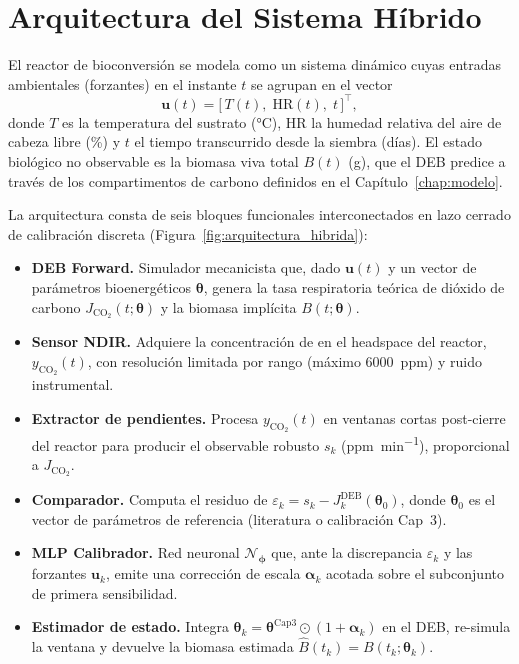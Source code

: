 \section{Arquitectura del Sistema Híbrido}
\label{sec:cap4_arquitectura}

El reactor de bioconversión se modela como un sistema dinámico cuyas entradas ambientales (forzantes) en el instante $t$ se agrupan en el vector
\begin{equation}
\mathbf{u}(t) = \bigl[\,T(t),\;\mathrm{HR}(t),\;t\,\bigr]^{\top},
\label{eq:forzantes}
\end{equation}
donde $T$ es la temperatura del sustrato (\si{\celsius}), $\mathrm{HR}$ la humedad relativa del aire de cabeza libre (\si{\percent}) y $t$ el tiempo transcurrido desde la siembra (días). El estado biológico no observable es la biomasa viva total $B(t)$ (\si{\gram}), que el DEB predice a través de los compartimentos de carbono definidos en el Capítulo~\ref{chap:modelo}.

La arquitectura consta de seis bloques funcionales interconectados en lazo cerrado de calibración discreta (Figura~\ref{fig:arquitectura_hibrida}):

\begin{itemize}
\item[\textbf{B1}] \textbf{DEB Forward.} Simulador mecanicista que, dado $\mathbf{u}(t)$ y un vector de parámetros bioenergéticos $\boldsymbol{\theta}$, genera la tasa respiratoria teórica de dióxido de carbono $J_{\mathrm{CO_2}}(t;\boldsymbol{\theta})$ y la biomasa implícita $B(t;\boldsymbol{\theta})$.
\item[\textbf{B2}] \textbf{Sensor NDIR.} Adquiere la concentración de  en el headspace del reactor, $y_{\mathrm{CO_2}}(t)$, con resolución limitada por rango (máximo \SI{6000}{ppm}) y ruido instrumental.
\item[\textbf{B3}] \textbf{Extractor de pendientes.} Procesa $y_{\mathrm{CO_2}}(t)$ en ventanas cortas post-cierre del reactor para producir el observable robusto $s_k$ (\si{ppm\per\minute}), proporcional a $J_{\mathrm{CO_2}}$.
\item[\textbf{B4}] \textbf{Comparador.} Computa el residuo de  $\varepsilon_k = s_k - J_k^{\mathrm{DEB}}(\boldsymbol{\theta}_0)$, donde $\boldsymbol{\theta}_0$ es el vector de parámetros de referencia (literatura o calibración Cap~3).
\item[\textbf{B5}] \textbf{MLP Calibrador.} Red neuronal $\mathcal{N}_{\boldsymbol{\phi}}$ que, ante la discrepancia $\varepsilon_k$ y las forzantes $\mathbf{u}_k$, emite una corrección de escala $\boldsymbol{\alpha}_k$ acotada sobre el subconjunto de primera sensibilidad.
\item[\textbf{B6}] \textbf{Estimador de estado.} Integra $\boldsymbol{\theta}_k = \boldsymbol{\theta}^{\mathrm{Cap3}} \odot (1+\boldsymbol{\alpha}_k)$ en el DEB, re-simula la ventana y devuelve la biomasa estimada $\hat{B}(t_k) = B(t_k;\boldsymbol{\theta}_k)$.
\end{itemize}

